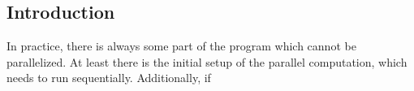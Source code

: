 \subsection{Introduction}

In practice, there is always some part of the program which cannot be parallelized. At least there is the initial setup of the parallel computation, which needs to run sequentially.
Additionally, if 